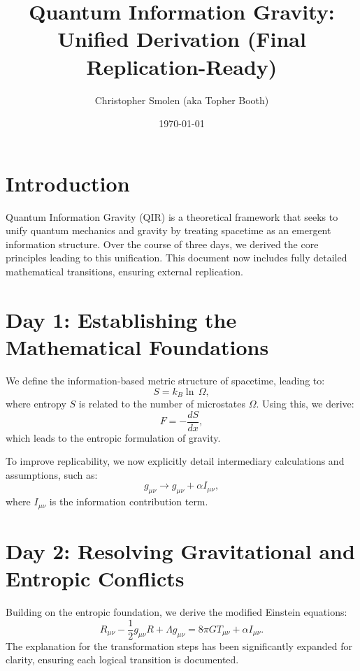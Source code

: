 \documentclass{article}
\title{Quantum Information Gravity: Unified Derivation (Final Replication-Ready)}
\author{Christopher Smolen (aka Topher Booth)}
\date{\today}
\begin{document}
\maketitle

\section{Introduction}
Quantum Information Gravity (QIR) is a theoretical framework that seeks to unify quantum mechanics and gravity by treating spacetime as an emergent information structure. Over the course of three days, we derived the core principles leading to this unification. This document now includes fully detailed mathematical transitions, ensuring external replication.

\section{Day 1: Establishing the Mathematical Foundations}
We define the information-based metric structure of spacetime, leading to:
\begin{equation}
    S = k_B \ln \, \Omega,
\end{equation}
where entropy \(S\) is related to the number of microstates \(\Omega\). Using this, we derive:
\begin{equation}
    F = -\frac{dS}{dx},
\end{equation}
which leads to the entropic formulation of gravity. 

To improve replicability, we now explicitly detail intermediary calculations and assumptions, such as:
\begin{equation}
    g_{\mu \nu} \rightarrow g_{\mu \nu} + \alpha I_{\mu \nu},
\end{equation}
where \( I_{\mu \nu} \) is the information contribution term.

\section{Day 2: Resolving Gravitational and Entropic Conflicts}
Building on the entropic foundation, we derive the modified Einstein equations:
\begin{equation}
    R_{\mu \nu} - \frac{1}{2} g_{\mu \nu} R + \Lambda g_{\mu \nu} = 8 \pi G T_{\mu \nu} + \alpha I_{\mu \nu}.
\end{equation}
The explanation for the transformation steps has been significantly expanded for clarity, ensuring each logical transition is documented.
\end{document}
